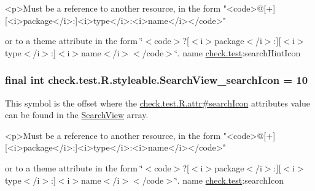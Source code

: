 \begin{DoxyVerb}      <p>Must be a reference to another resource, in the form "<code>@[+][<i>package</i>:]<i>type</i>:<i>name</i></code>"
\end{DoxyVerb}
 or to a theme attribute in the form \char`\"{}$<$code$>$?\mbox{[}$<$i$>$package$<$/i$>$\+:\mbox{]}\mbox{[}$<$i$>$type$<$/i$>$\+:\mbox{]}$<$i$>$name$<$/i$>$$<$/code$>$\char`\"{}.  name \hyperlink{namespacecheck_1_1test}{check.\+test}\+:search\+Hint\+Icon \hypertarget{classcheck_1_1test_1_1_r_1_1styleable_ab032023905a333c304872772b4b7aa87}{}
\subsubsection[{Search\+View\+\_\+search\+Icon}]{\setlength{\rightskip}{0pt plus 5cm}final int check.\+test.\+R.\+styleable.\+Search\+View\+\_\+search\+Icon = 10\hspace{0.3cm}{\ttfamily [static]}}\label{classcheck_1_1test_1_1_r_1_1styleable_ab032023905a333c304872772b4b7aa87}
This symbol is the offset where the \hyperlink{classcheck_1_1test_1_1_r_1_1attr_a717dce7ca09db8fdf5d59a56a1a70ee0}{check.\+test.\+R.\+attr\#search\+Icon} attribute\textquotesingle{}s value can be found in the \hyperlink{classcheck_1_1test_1_1_r_1_1styleable_af133609668e9a4263b21387e9a7574f8}{Search\+View} array.

\begin{DoxyVerb}      <p>Must be a reference to another resource, in the form "<code>@[+][<i>package</i>:]<i>type</i>:<i>name</i></code>"
\end{DoxyVerb}
 or to a theme attribute in the form \char`\"{}$<$code$>$?\mbox{[}$<$i$>$package$<$/i$>$\+:\mbox{]}\mbox{[}$<$i$>$type$<$/i$>$\+:\mbox{]}$<$i$>$name$<$/i$>$$<$/code$>$\char`\"{}.  name \hyperlink{namespacecheck_1_1test}{check.\+test}\+:search\+Icon \hypertarget{classcheck_1_1test_1_1_r_1_1styleable_a85d86db6e7bedfaa5d09b84a2324b42b}{}
